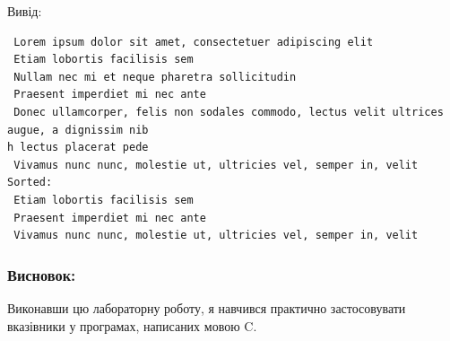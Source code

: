 \documentclass[12pt]{extreport}
\begin{document}
Вивід:

\begin{lstlisting}
 Lorem ipsum dolor sit amet, consectetuer adipiscing elit
 Etiam lobortis facilisis sem
 Nullam nec mi et neque pharetra sollicitudin
 Praesent imperdiet mi nec ante
 Donec ullamcorper, felis non sodales commodo, lectus velit ultrices augue, a dignissim nib
h lectus placerat pede
 Vivamus nunc nunc, molestie ut, ultricies vel, semper in, velit
Sorted:
 Etiam lobortis facilisis sem
 Praesent imperdiet mi nec ante
 Vivamus nunc nunc, molestie ut, ultricies vel, semper in, velit
\end{lstlisting}

\subsubsection*{Висновок:}
Виконавши цю лабораторну роботу, я навчився практично
застосовувати вказівники у програмах, написаних мовою C.
\end{document}
